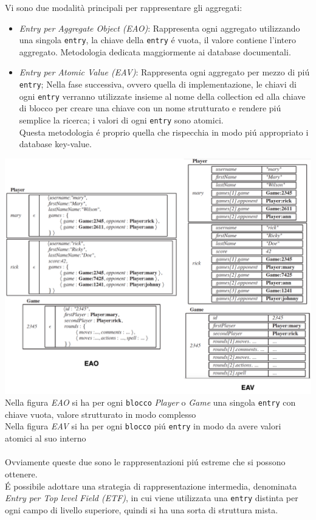 Vi sono due modalità principali per rappresentare gli aggregati:
\begin{itemize}
    \item \emph{Entry per Aggregate Object (EAO)}: Rappresenta ogni aggregato utilizzando una singola
    \texttt{entry}, la chiave della \texttt{entry} é vuota, il valore contiene l'intero aggregato.
    Metodologia dedicata maggiormente ai database documentali.
    \item \emph{Entry per Atomic Value (EAV)}: Rappresenta ogni aggregato per mezzo di piú \texttt{entry};
    Nella fase successiva, ovvero quella di implementazione, le chiavi di ogni \texttt{entry} verranno utilizzate
    insieme al nome della collection ed alla chiave di blocco per creare una chiave con un
    nome strutturato e rendere piú semplice la ricerca;
    i valori di ogni \texttt{entry} sono atomici.\\
    Questa metodologia é proprio quella che rispecchia in modo piú appropriato i database key-value.
\end{itemize}
\vspace{0.5cm}
    \includegraphics[width=1\textwidth]{img/eao.eav}
Nella figura \emph{EAO} si ha per ogni \texttt{blocco} \emph{Player} o \emph{Game} una singola \texttt{entry} con chiave vuota,
valore strutturato in modo complesso
\\
Nella figura \emph{EAV} si ha per ogni \texttt{blocco} piú \texttt{entry} in modo da avere valori atomici al suo interno
\\
\\
Ovviamente queste due sono le rappresentazioni piú estreme che si possono ottenere.\\
É possibile adottare una strategia di rappresentazione intermedia, denominata \emph{Entry per Top level Field (ETF)}, in cui
viene utilizzata una \texttt{entry} distinta per ogni campo di livello superiore, quindi si ha una sorta di struttura mista.


